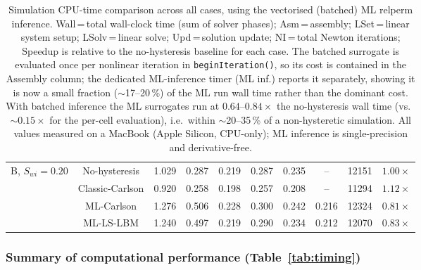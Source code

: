 \begin{table}[h!]
{\begin{tabular}{|l|c|c|c|c|c|c|c|c|c|}
\hline
\multirow{4}{*}{B, $S_{wi}=0.20$}
  & No-hysteresis    & 1.029 & 0.287 & 0.219 & 0.287 & 0.235 & --    & 12151 & $1.00\times$ \\
  & Classic-Carlson  & 0.920 & 0.258 & 0.198 & 0.257 & 0.208 & --    & 11294 & $1.12\times$ \\
  & ML-Carlson       & 1.276 & 0.506 & 0.228 & 0.300 & 0.242 & 0.216 & 12324 & $0.81\times$ \\
  & ML-LS-LBM        & 1.240 & 0.497 & 0.219 & 0.290 & 0.234 & 0.212 & 12070 & $0.83\times$ \\
\hline
\end{tabular}
}
\caption{Simulation CPU-time comparison across all cases, using the vectorised
(batched) ML relperm inference. Wall\,=\,total wall-clock time (sum of solver
phases); Asm\,=\,assembly; LSet\,=\,linear system setup; LSolv\,=\,linear solve;
Upd\,=\,solution update; NI\,=\,total Newton iterations; Speedup is relative to
the no-hysteresis baseline for each case. The batched surrogate is evaluated
once per nonlinear iteration in \texttt{beginIteration()}, so its cost is
contained in the Assembly column; the dedicated ML-inference timer (ML inf.)
reports it separately, showing it is now a small fraction ($\sim$17--20\,\%) of
the ML run wall time rather than the dominant cost. With batched inference the
ML surrogates run at $0.64$--$0.84\times$ the no-hysteresis wall time (vs.\
$\sim$$0.15\times$ for the per-cell evaluation), i.e.\ within $\sim$20--35\,\%
of a non-hysteretic simulation. All values measured on a MacBook (Apple
Silicon, CPU-only); ML inference is single-precision and derivative-free.}
\label{tab:timing_metrics}
\end{table}


\subsubsection*{Summary of computational performance (Table~\ref{tab:timing})}

